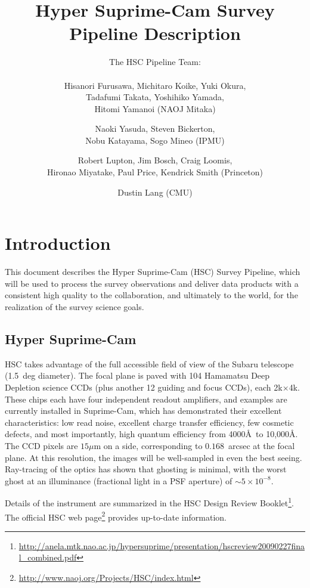 \documentclass[12pt]{article}
\title{Hyper Suprime-Cam Survey \\
  Pipeline Description}
\author{
  The HSC Pipeline Team: \\ \\
  Hisanori Furusawa,
  Michitaro Koike,
  Yuki Okura, \\
  Tadafumi Takata,
  Yoshihiko Yamada, \\
  Hitomi Yamanoi (NAOJ Mitaka) \and
  Naoki Yasuda,
  Steven Bickerton, \\
  Nobu Katayama,
  Sogo Mineo (IPMU) \and
  Robert Lupton,
  Jim Bosch,
  Craig Loomis, \\
  Hironao Miyatake,
  Paul Price,
  Kendrick Smith (Princeton) \and
  Dustin Lang (CMU) \\
}
\newcommand\x         {\hbox{$\times$}}
\begin{document}
\maketitle
\pagestyle{headings}

\begin{abstract}
\end{abstract}

\clearpage

\tableofcontents

\clearpage

\section{Introduction}

This document describes the Hyper Suprime-Cam (HSC) Survey Pipeline, which will be used to process the survey
observations and deliver data products with a consistent high quality to the collaboration, and ultimately to
the world, for the realization of the survey science goals.

\subsection{Hyper Suprime-Cam}


HSC takes advantage of the full accessible field of view of the Subaru telescope (1.5~deg diameter).  The
focal plane is paved with 104 Hamamatsu Deep Depletion science CCDs (plus another 12 guiding and focus CCDs),
each 2k\x 4k. These chips each have four independent readout amplifiers, and examples are currently installed
in Suprime-Cam, which has demonstrated their excellent characteristics: low read noise, excellent charge
transfer efficiency, few cosmetic defects, and most importantly, high quantum efficiency from 4000\AA\ to
10,000\AA.  The CCD pixels are $15\mu$m on a side, corresponding to $0.168$~arcsec at the focal plane. At this
resolution, the images will be well-sampled in even the best seeing.  Ray-tracing of the optics has shown that
ghosting is minimal, with the worst ghost at an illuminance (fractional light in a PSF aperture) of $\sim 5
\times 10^{-8}$.

Details of the instrument are summarized in the HSC Design Review
Booklet\footnote{\url{http://anela.mtk.nao.ac.jp/hypersuprime/presentation/hscreview20090227final_combined.pdf}}. The
official HSC web page\footnote{\url{http://www.naoj.org/Projects/HSC/index.html}} provides up-to-date
information.
\end{document}
